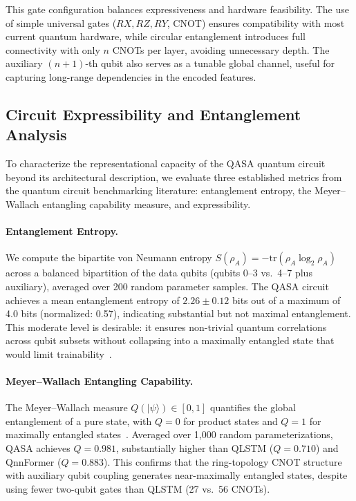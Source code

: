 \documentclass[conference]{IEEEtran}
\newcommand{\tr}[0]{\mathrm{tr}}
\begin{document}
This gate configuration balances expressiveness and hardware feasibility. The use of simple universal gates ($RX, RZ, RY$, CNOT) ensures compatibility with most current quantum hardware, while circular entanglement introduces full connectivity with only $n$ CNOTs per layer, avoiding unnecessary depth. The auxiliary $(n+1)$-th qubit also serves as a tunable global channel, useful for capturing long-range dependencies in the encoded features.

\subsection{Circuit Expressibility and Entanglement Analysis}

To characterize the representational capacity of the QASA quantum circuit beyond its architectural description, we evaluate three established metrics from the quantum circuit benchmarking literature: entanglement entropy, the Meyer--Wallach entangling capability measure, and expressibility.

\paragraph{Entanglement Entropy.}
We compute the bipartite von Neumann entropy $S(\rho_A) = -\tr(\rho_A \log_2 \rho_A)$ across a balanced bipartition of the data qubits (qubits 0--3 vs.\ 4--7 plus auxiliary), averaged over 200 random parameter samples. The QASA circuit achieves a mean entanglement entropy of $2.26 \pm 0.12$ bits out of a maximum of 4.0 bits (normalized: 0.57), indicating substantial but not maximal entanglement. This moderate level is desirable: it ensures non-trivial quantum correlations across qubit subsets without collapsing into a maximally entangled state that would limit trainability~\cite{mcclean2018barren}.

\paragraph{Meyer--Wallach Entangling Capability.}
The Meyer--Wallach measure $Q(|\psi\rangle) \in [0, 1]$ quantifies the global entanglement of a pure state, with $Q = 0$ for product states and $Q = 1$ for maximally entangled states~\cite{meyer2002global}. Averaged over 1{,}000 random parameterizations, QASA achieves $Q = 0.981$, substantially higher than QLSTM ($Q = 0.710$) and QnnFormer ($Q = 0.883$). This confirms that the ring-topology CNOT structure with auxiliary qubit coupling generates near-maximally entangled states, despite using fewer two-qubit gates than QLSTM (27 vs.\ 56 CNOTs).
\end{document}
